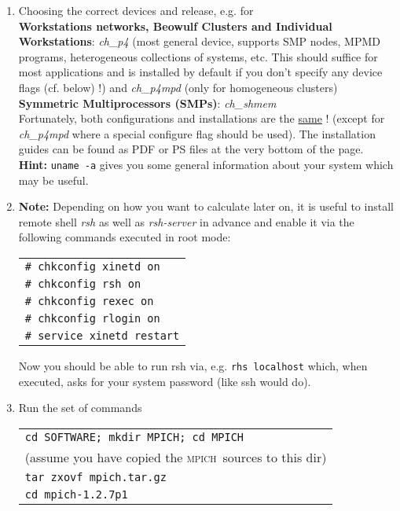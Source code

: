 \documentclass[a4paper,12pt]{article}
\newcommand{\mpich}{\textsc{mpich}\ }
\begin{document}
\begin{enumerate}
\begin{enumerate}
\begin{enumerate}
\item Choosing the correct devices and release, e.g. for \\
   \textbf{Workstations networks, Beowulf Clusters and Individual
     Workstations}: \textit{ch\_p4} (most general device, supports SMP nodes,
   MPMD programs, heterogeneous collections of systems,
   etc. This should suffice for most applications and is installed by default
   if you don't specify any device flags (cf. below) !) and  \textit{ch\_p4mpd}
   (only for homogeneous clusters)\\
   \textbf{Symmetric Multiprocessors (SMPs)}: \textit{ch\_shmem}\\
Fortunately, both configurations and installations are the \underline{same} ! (except for
\textit{ch\_p4mpd} where a special configure flag should be used).
 The installation guides can be found as PDF or PS files at the very bottom of the
   page.\\
   \textbf{Hint:} \texttt{uname -a} gives you some general information about your system
   which may be useful.
\item \textbf{Note:} Depending on how you want to calculate later on, it is
  useful to install remote shell \textit{rsh} as well as \textit{rsh-server} in advance and
  enable it via the following commands executed in root mode:
  \begin{center}
    \begin{tabular}{l}
      \texttt{\# chkconfig xinetd on}\\
      \texttt{\# chkconfig rsh on}\\
      \texttt{\# chkconfig rexec on}\\
      \texttt{\# chkconfig rlogin on}\\
      \texttt{\# service xinetd restart}
    \end{tabular}
  \end{center}
Now you should be able to run rsh via, e.g. \texttt{rhs localhost} which, when
executed, asks for your system password (like ssh would do).
  \item Run the set of commands \begin{center}
         \begin{tabular}{l} 
           \texttt{cd SOFTWARE; mkdir MPICH; cd MPICH}\\
           (assume you have copied the \mpich sources to this dir)\\
           \texttt{tar zxovf mpich.tar.gz}\\
           \texttt{cd mpich-1.2.7p1}
           

\end{tabular}
\end{center}
\end{enumerate}
\end{enumerate}
\end{enumerate}
\end{document}
